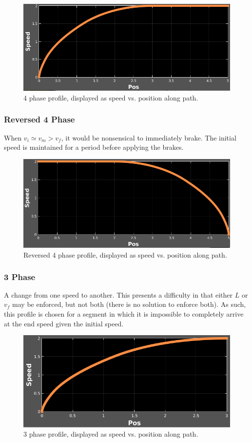 \documentclass[letterpaper, 10 pt, conference]{ieeeconf}  %
\begin{document}
\begin{figure}[thpb]
  \centering
  \includegraphics[width=0.7\columnwidth]{graphics/4phase_v(s).png}
  \caption{4 phase profile, displayed as speed vs. position along path.}
  \label{fig:4phaseprofile}
\end{figure}

\subsubsection{Reversed 4 Phase}
\label{sec:reversed4phase}

When $v_i \simeq v_m > v_f$, it would be nonsensical to immediately brake.
The initial speed is maintained for a period before applying the brakes.

\begin{figure}[thpb]
  \centering
  \includegraphics[width=0.7\columnwidth]{graphics/4Rphase_all_derivatives.png}
  \caption{Reversed 4 phase profile, displayed as speed vs. position along path.}
  \label{fig:4rphaseprofile}
\end{figure}

\subsubsection{3 Phase}
\label{sec:3phase}

A change from one speed to another. 
This presents a difficulty in that either $L$ or $v_f$ may be enforced, but not both (there is no solution to enforce both).
As such, this profile is chosen for a segment in which it is impossible to completely arrive at the end speed given the initial speed. 

\begin{figure}[thpb]
  \centering
  \includegraphics[width=0.7\columnwidth]{graphics/3phase_v(s).png}
  \caption{3 phase profile, displayed as speed vs. position along path.}
  \label{fig:3phaseprofile}
\end{figure}
\end{document}

